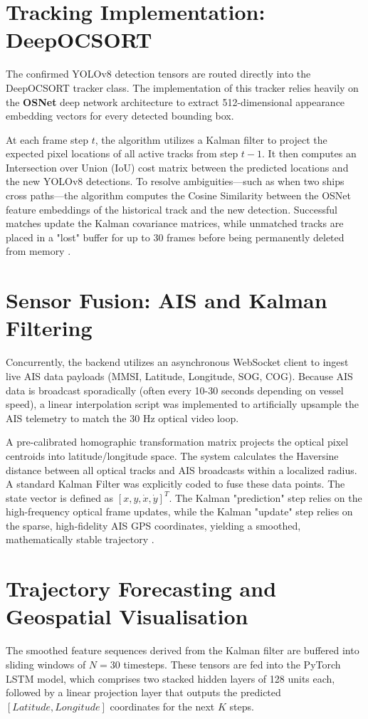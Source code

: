\section{Tracking Implementation: DeepOCSORT}
The confirmed YOLOv8 detection tensors are routed directly into the DeepOCSORT tracker class. The implementation of this tracker relies heavily on the \textbf{OSNet} deep network architecture to extract 512-dimensional appearance embedding vectors for every detected bounding box. 

At each frame step $t$, the algorithm utilizes a Kalman filter to project the expected pixel locations of all active tracks from step $t-1$. It then computes an Intersection over Union (IoU) cost matrix between the predicted locations and the new YOLOv8 detections. To resolve ambiguities—such as when two ships cross paths—the algorithm computes the Cosine Similarity between the OSNet feature embeddings of the historical track and the new detection. Successful matches update the Kalman covariance matrices, while unmatched tracks are placed in a "lost" buffer for up to 30 frames before being permanently deleted from memory \citep{Ref15}.

\section{Sensor Fusion: AIS and Kalman Filtering}
Concurrently, the backend utilizes an asynchronous WebSocket client to ingest live AIS data payloads (MMSI, Latitude, Longitude, SOG, COG). Because AIS data is broadcast sporadically (often every 10-30 seconds depending on vessel speed), a linear interpolation script was implemented to artificially upsample the AIS telemetry to match the 30 Hz optical video loop.

A pre-calibrated homographic transformation matrix projects the optical pixel centroids into latitude/longitude space. The system calculates the Haversine distance between all optical tracks and AIS broadcasts within a localized radius. A standard Kalman Filter was explicitly coded to fuse these data points. The state vector is defined as $[x, y, \dot{x}, \dot{y}]^{T}$. The Kalman "prediction" step relies on the high-frequency optical frame updates, while the Kalman "update" step relies on the sparse, high-fidelity AIS GPS coordinates, yielding a smoothed, mathematically stable trajectory \citep{Ref16}.

\section{Trajectory Forecasting and Geospatial Visualisation}
The smoothed feature sequences derived from the Kalman filter are buffered into sliding windows of $N=30$ timesteps. These tensors are fed into the PyTorch LSTM model, which comprises two stacked hidden layers of 128 units each, followed by a linear projection layer that outputs the predicted $[Latitude, Longitude]$ coordinates for the next $K$ steps.

